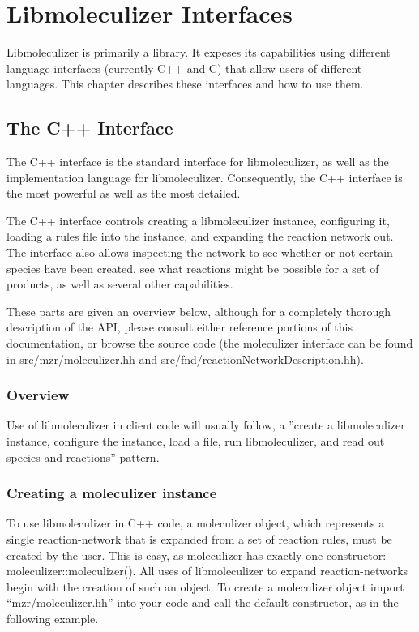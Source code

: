 \chapter{Libmoleculizer Interfaces}
\label{chap:interfacesChapter}

Libmoleculizer is primarily a library.  It expeses its capabilities
using different language interfaces (currently C++ and C) that allow
users of different languages.  This chapter describes these
interfaces and how to use them.

\section{The C++ Interface}
The C++ interface is the standard interface for libmoleculizer, as
well as the implementation language for libmoleculizer.  Consequently,
the C++ interface is the most powerful as well as the most detailed.

The C++ interface controls creating a libmoleculizer instance,
configuring it, loading a rules file into the instance, and expanding
the reaction network out.  The interface also allows inspecting the
network to see whether or not certain species have been created, see
what reactions might be possible for a set of products, as well as
several other capabilities.  

These parts are given an overview below, although for a completely
thorough description of the API, please consult either reference
portions of this documentation, or browse the source code (the
moleculizer interface can be found in src/mzr/moleculizer.hh and
src/fnd/reactionNetworkDescription.hh).

\subsection{Overview}
Use of libmoleculizer in client code will usually follow, a ''create a
libmoleculizer instance, configure the instance, load a file, run
libmoleculizer, and read out species and reactions'' pattern.  

\subsection{Creating a moleculizer instance}
To use libmoleculizer in C++ code, a moleculizer object, which
represents a single reaction-network that is expanded from a set of
reaction rules, must be created by the user. This is easy, as
moleculizer has exactly one constructor: moleculizer::moleculizer().
All uses of libmoleculizer to expand reaction-networks begin with the
creation of such an object.  To create a moleculizer object import
``mzr/moleculizer.hh''  into your code and call the default
constructor, as in the following example.  

